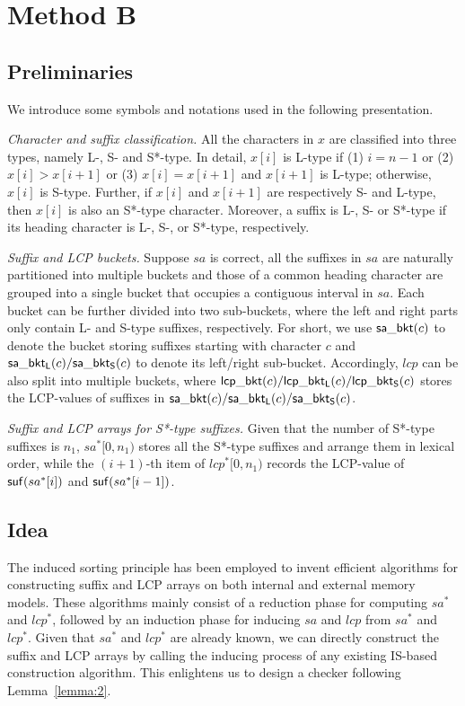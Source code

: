 \documentclass[10pt,journal,compsoc]{IEEEtran}
\begin{document}
\section{Method B} \label{sec:method2}

\subsection{Preliminaries} \label{sec:method2:preliminaries}

We introduce some symbols and notations used in the following presentation.

{\em Character and suffix classification.} All the characters in $x$ are classified into three types, namely L-, S- and S*-type. In detail, $x[i]$ is L-type if (1) $i = n - 1$ or (2) $x[i] > x[i + 1]$ or (3) $x[i] = x[i + 1]$ and $x[i + 1]$ is L-type; otherwise, $x[i]$ is S-type. Further, if $x[i]$ and $x[i + 1]$ are respectively S- and L-type, then $x[i]$ is also an S*-type character. Moreover, a suffix is L-, S- or S*-type if its heading character is L-, S-, or S*-type, respectively.

{\em Suffix and LCP buckets.} Suppose $sa$ is correct, all the suffixes in $sa$ are naturally partitioned into multiple buckets and those of a common heading character are grouped into a single bucket that occupies a contiguous interval in $sa$. Each bucket can be further divided into two sub-buckets, where the left and right parts only contain L- and S-type suffixes, respectively. For short, we use ${\sf sa\_bkt}(c)$ to denote the bucket storing suffixes starting with character $c$ and ${\sf sa\_bkt_L}(c)/{\sf sa\_bkt_S}(c)$ to denote its left/right sub-bucket. Accordingly, $lcp$ can be also split into multiple buckets, where ${\sf lcp\_bkt}(c)/{\sf lcp\_bkt_L}(c)/{\sf lcp\_bkt_S}(c)$ stores the LCP-values of suffixes in ${\sf sa\_bkt}(c)/{\sf sa\_bkt_L}(c)/{\sf sa\_bkt_S}(c)$.

{\em Suffix and LCP arrays for S*-type suffixes.} Given that the number of S*-type suffixes is $n_1$, $sa^*[0, n_1)$ stores all the S*-type suffixes and arrange them in lexical order, while the $(i + 1)$-th item of $lcp^*[0, n_1)$ records the LCP-value of ${\sf suf}(sa^*[i])$ and ${\sf suf}(sa^*[i - 1])$.

\subsection{Idea} \label{sec:method2:idea}

The induced sorting principle has been employed to invent efficient algorithms for constructing suffix and LCP arrays on both internal and external memory models. These algorithms mainly consist of a reduction phase for computing $sa^*$ and $lcp^*$, followed by an induction phase for inducing $sa$ and $lcp$ from $sa^*$ and $lcp^*$. Given that $sa^*$ and $lcp^*$ are already known, we can directly construct the suffix and LCP arrays by calling the inducing process of any existing IS-based construction algorithm. This enlightens us to design a checker following Lemma~\ref{lemma:2}. 
	
\end{document}
